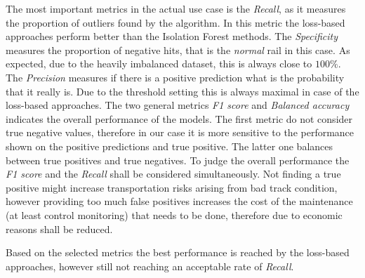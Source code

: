 The most important metrics in the actual use case is the \emph{Recall}, as it measures the proportion of outliers
found by the algorithm.
In this metric the loss-based approaches perform better than the Isolation Forest methods.
The \emph{Specificity} measures the proportion of negative hits, that is the \emph{normal} rail
in this case.
As expected, due to the heavily imbalanced dataset, this is always close to $100\%$.
The \emph{Precision} measures if there is a positive prediction what is the probability
that it really is.
Due to the threshold setting this is always maximal in case of the loss-based approaches.
The two general metrics \emph{F1 score} and \emph{Balanced accuracy} indicates the overall
performance of the models.
The first metric do not consider true negative values, therefore in our case it is more sensitive
to the performance shown on the positive predictions and true positive.
The latter one balances between true positives and true negatives.
To judge the overall performance the \emph{F1 score} and the \emph{Recall} shall be considered
simultaneously.
Not finding a true positive might increase transportation risks arising from bad track condition,
however providing too much false positives increases the cost of the maintenance (at least control
monitoring) that needs to be done, therefore due to economic reasons shall be reduced.

Based on the selected metrics the best performance is reached by the loss-based approaches,
however still not reaching an acceptable rate of \emph{Recall}.

